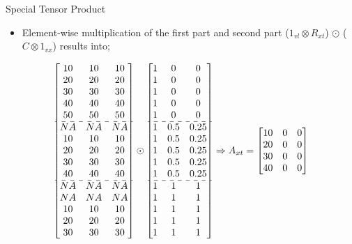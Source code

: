 \documentclass[english]{beamer}
\begin{document}
\begin{frame}{Special Tensor Product}
\begin{itemize}
    \item Element-wise multiplication of the first part and second part (\(1_{vl} \otimes R_{xt}\)) \(\odot\) (\(C \otimes 1_{vx}\)) results into;
\end{itemize}
\footnotesize
\[
\begin{bmatrix}
10 & 10 & 10 \\
20 & 20 & 20 \\
30 & 30 & 30 \\
40 & 40 & 40 \\
50 & 50 & 50 \\ \hdashline
NA & NA & NA \\
10 & 10 & 10 \\
20 & 20 & 20 \\
30 & 30 & 30 \\
40 & 40 & 40 \\ \hdashline
NA & NA & NA \\
NA & NA& NA \\
10 & 10 & 10 \\
20 & 20 & 20 \\
30 & 30 & 30 \\ 
\end{bmatrix} \odot \begin{bmatrix}
1 & 0 & 0 \\
1 & 0 & 0 \\
1 & 0 & 0 \\
1 & 0 & 0 \\
1 & 0 & 0 \\ \hdashline
1 & 0.5 & 0.25 \\
1 & 0.5 & 0.25 \\
1 & 0.5 & 0.25 \\
1 & 0.5 & 0.25 \\
1 & 0.5 & 0.25 \\ \hdashline
1 & 1 & 1 \\
1 & 1 & 1 \\
1 & 1 & 1 \\
1 & 1 & 1 \\
1 & 1 & 1 \\ 
\end{bmatrix} \Rightarrow A_{xt} = \begin{bmatrix}
10 & 0 & 0 \\
20 & 0 & 0 \\
30 & 0 & 0 \\
40 & 0 & 0 \\

\end{bmatrix}\]
\end{frame}
\end{document}
